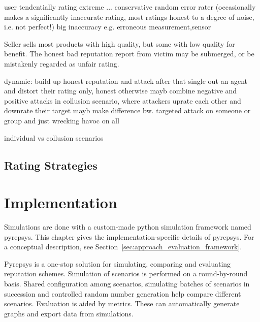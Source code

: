 \documentclass[%
    ]{\PathToTumTemplate/thesis/tum_thesis}
\begin{document}
user tendentially rating extreme
... conservative
random error rater (occasionally makes a significantly inaccurate rating, most ratings honest to a degree of noise, i.e. not perfect!)
	big inaccuracy e.g. erroneous measurement,sensor
	
Seller sells most products with high quality, but some with low quality for benefit. The honest bad reputation report from victim may be submerged, or be mistakenly regarded as unfair rating. \cite{ping_xu_rating_2005}

	
	
dynamic:
build up honest reputation and attack after that
single out an agent and distort their rating only, honest otherwise
mayb combine negative and positive attacks in collusion scenario, where attackers uprate each other and downrate their target
mayb make difference bw. targeted attack on someone or group and just wrecking havoc on all

individual vs collusion scenarios



\section{Rating Strategies}\label{sec:approach_rating_strategies}









\chapter{Implementation}\label{chap:implementation}

Simulations are done with a custom-made python simulation framework named pyrepsys.
This chapter gives the implementation-specific details of pyrepsys. 
For a conceptual description, see Section~\ref{sec:approach_evaluation_framework}.

Pyrepsys is a one-stop solution for simulating, comparing and evaluating reputation schemes.
Simulation of scenarios is performed on a round-by-round basis.
Shared configuration among scenarios, simulating batches of scenarios in succession and controlled random number generation help compare different scenarios.
Evaluation is aided by metrics.
These can automatically generate graphs and export data from simulations.
\end{document}
